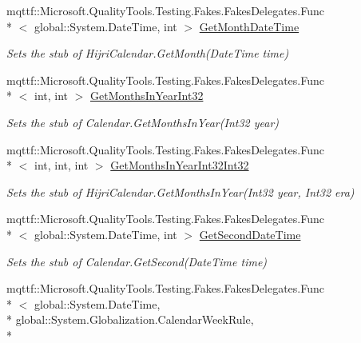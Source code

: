 \begin{DoxyCompactItemize}
mqttf\-::\-Microsoft.\-Quality\-Tools.\-Testing.\-Fakes.\-Fakes\-Delegates.\-Func\\*
$<$ global\-::\-System.\-Date\-Time, int $>$ \hyperlink{class_system_1_1_globalization_1_1_fakes_1_1_stub_hijri_calendar_ad634b84de64e645a0cd396924c9f684e}{Get\-Month\-Date\-Time}
\begin{DoxyCompactList}\small\item\em Sets the stub of Hijri\-Calendar.\-Get\-Month(\-Date\-Time time)\end{DoxyCompactList}\item 
mqttf\-::\-Microsoft.\-Quality\-Tools.\-Testing.\-Fakes.\-Fakes\-Delegates.\-Func\\*
$<$ int, int $>$ \hyperlink{class_system_1_1_globalization_1_1_fakes_1_1_stub_hijri_calendar_ac267ff71c6e313f27b47a8b9cf71fe15}{Get\-Months\-In\-Year\-Int32}
\begin{DoxyCompactList}\small\item\em Sets the stub of Calendar.\-Get\-Months\-In\-Year(\-Int32 year)\end{DoxyCompactList}\item 
mqttf\-::\-Microsoft.\-Quality\-Tools.\-Testing.\-Fakes.\-Fakes\-Delegates.\-Func\\*
$<$ int, int, int $>$ \hyperlink{class_system_1_1_globalization_1_1_fakes_1_1_stub_hijri_calendar_a0c9698322f0c20b19dcdadb5e2099b21}{Get\-Months\-In\-Year\-Int32\-Int32}
\begin{DoxyCompactList}\small\item\em Sets the stub of Hijri\-Calendar.\-Get\-Months\-In\-Year(\-Int32 year, Int32 era)\end{DoxyCompactList}\item 
mqttf\-::\-Microsoft.\-Quality\-Tools.\-Testing.\-Fakes.\-Fakes\-Delegates.\-Func\\*
$<$ global\-::\-System.\-Date\-Time, int $>$ \hyperlink{class_system_1_1_globalization_1_1_fakes_1_1_stub_hijri_calendar_aac3a5f3d7cd89eb576ad259e11b90ec4}{Get\-Second\-Date\-Time}
\begin{DoxyCompactList}\small\item\em Sets the stub of Calendar.\-Get\-Second(\-Date\-Time time)\end{DoxyCompactList}\item 
mqttf\-::\-Microsoft.\-Quality\-Tools.\-Testing.\-Fakes.\-Fakes\-Delegates.\-Func\\*
$<$ global\-::\-System.\-Date\-Time, \\*
global\-::\-System.\-Globalization.\-Calendar\-Week\-Rule, \\*

\end{DoxyCompactItemize}
